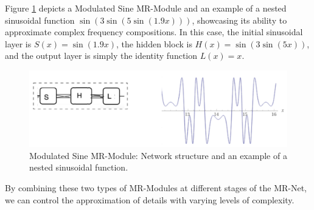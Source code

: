 Figure \ref{f:modulated} depicts a Modulated Sine MR-Module and an example of a nested sinusoidal function \( \sin\left( 3\sin\left(5\sin(1.9x)\right)\right) \), showcasing its ability to approximate complex frequency compositions. In this case, the initial sinusoidal layer is \( S(x) = \sin(1.9 x) \), the hidden block is \( H(x) = \sin\left(3\sin(5x)\right) \), and the output layer is simply the identity function \( L(x) = x \).

\begin{figure}[!h]
\centering
\includegraphics[width=0.9\linewidth]{img/ch4/modulated-sine.png}
\caption{Modulated Sine MR-Module: Network structure and an example of a nested sinusoidal function.}
\label{f:modulated}
\end{figure}

By combining these two types of MR-Modules at different stages of the MR-Net, we can control the approximation of details with varying levels of complexity. 





